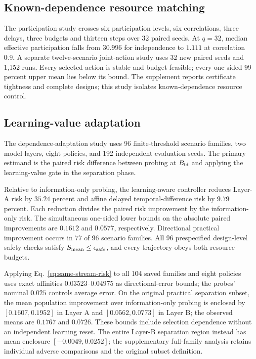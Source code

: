 \documentclass[journal]{IEEEtran}
\begin{document}
\subsection{Known-dependence resource matching}
The participation study crosses six participation levels, six correlations, three delays, three budgets and thirteen steps over 32 paired seeds.
At $q=32$, median effective participation falls from $30.996$ for independence to $1.111$ at correlation $0.9$.
A separate twelve-scenario joint-action study uses 32 new paired seeds and 1,152 runs.
Every selected action is stable and budget feasible; every one-sided 99 percent upper mean lies below its bound.
The supplement reports certificate tightness and complete designs; this study isolates known-dependence resource control.

\subsection{Learning-value adaptation}
The dependence-adaptation study uses 96 finite-threshold scenario families, two model layers, eight policies, and 192 independent evaluation seeds.
The primary estimand is the paired risk difference between probing at $B_{\rm id}$ and applying the learning-value gate in the separation phase.

Relative to information-only probing, the learning-aware controller reduces Layer-A risk by $35.24$ percent and affine delayed temporal-difference risk by $9.79$ percent.
Each reduction divides the paired risk improvement by the information-only risk.
The simultaneous one-sided lower bounds on the absolute paired improvements are $0.1612$ and $0.0577$, respectively.
Directional practical improvement occurs in 77 of 96 scenario families.
All 96 prespecified design-level safety checks satisfy $S_{\rm mean}\le\epsilon_{\rm safe}$, and every trajectory obeys both resource budgets.

Applying Eq.~\eqref{eq:same-stream-risk} to all 104 saved families and eight policies uses exact affinities $0.03523$--$0.04975$ as directional-error bounds; the probes' nominal $0.025$ controls average error.
On the original practical separation subset, the mean population improvement over information-only probing is enclosed by $[0.1607,0.1952]$ in Layer A and $[0.0562,0.0773]$ in Layer B; the observed means are $0.1767$ and $0.0726$.
These bounds include selection dependence without an independent learning reset.
The entire Layer-B separation region instead has mean enclosure $[-0.0049,0.0252]$; the supplementary full-family analysis retains individual adverse comparisons and the original subset definition.
\end{document}
